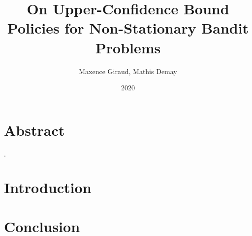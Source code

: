 \documentclass{article}
\title{On Upper-Confidence Bound Policies for Non-Stationary Bandit Problems}
\author{Maxence Giraud, Mathis Demay}
\date{2020}
\begin{document}
\maketitle

\section*{Abstract}
\cite{garivier2008upperconfidence}.

\section{Introduction}

\section{Conclusion}


\end{document}
